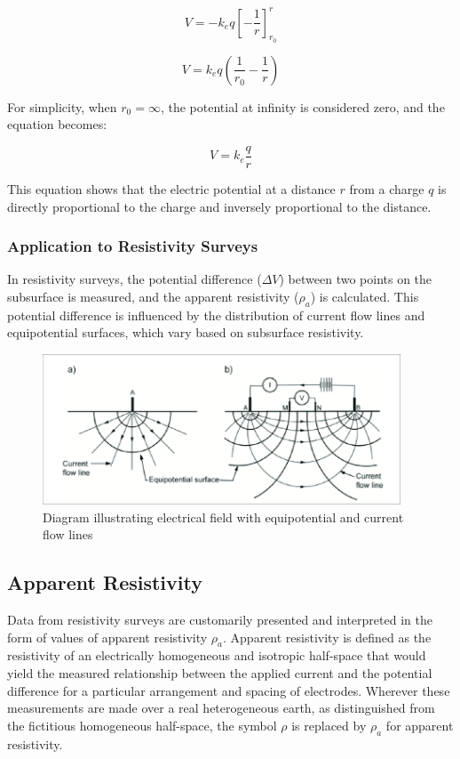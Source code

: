 \documentclass[12pt,a4paper]{report}
\begin{document}
\begin{equation}
V = - k_e q \left[ -\frac{1}{r} \right]_{r_0}^{r}
\end{equation}

\begin{equation}
V = k_e q \left( \frac{1}{r_0} - \frac{1}{r} \right)
\end{equation}

For simplicity, when \(r_0 = \infty\), the potential at infinity is considered zero, and the equation becomes:

\begin{equation}
V = k_e \frac{q}{r}
\end{equation}

This equation shows that the electric potential at a distance \(r\) from a charge \(q\) is directly proportional to the charge and inversely proportional to the distance.

\subsubsection{Application to Resistivity Surveys}
In resistivity surveys, the potential difference (\(\Delta V\)) between two points on the subsurface is measured, and the apparent resistivity (\(\rho_a\)) is calculated. This potential difference is influenced by the distribution of current flow lines and equipotential surfaces, which vary based on subsurface resistivity.


\begin{figure}[h]
    \centering
    \includegraphics[width=0.95\textwidth]{Simplified-current-flow-lines-and-equipotential-surfaces-arising-from-a-a-single.png}
    \caption{Diagram illustrating electrical field with equipotential and current flow lines}
\end{figure}

\subsection{Apparent Resistivity}
Data from resistivity surveys are customarily presented and interpreted in the form of values of apparent resistivity \(\rho_a\). Apparent resistivity is defined as the resistivity of an electrically homogeneous and isotropic half-space that would yield the measured relationship between the applied current and the potential difference for a particular arrangement and spacing of electrodes. Wherever these measurements are made over a real heterogeneous earth, as distinguished from the fictitious homogeneous half-space, the symbol \(\rho\) is replaced by \(\rho_a\) for apparent resistivity.
\end{document}

